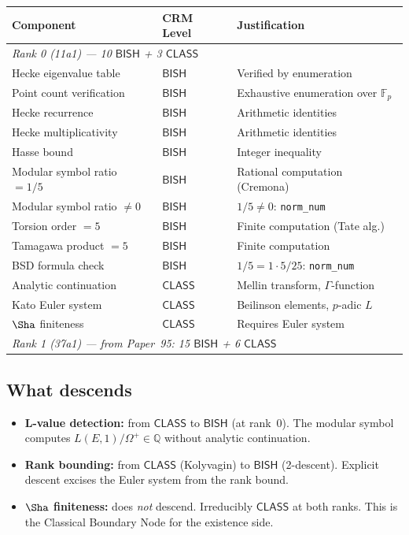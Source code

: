\documentclass[11pt]{article}
\theoremstyle{plain}
\theoremstyle{definition}
\theoremstyle{remark}
\newcommand{\Q}{\mathbb{Q}}
\newcommand{\F}{\mathbb{F}}
\newcommand{\BISH}{\ensuremath{\mathsf{BISH}}}
\newcommand{\CLASS}{\ensuremath{\mathsf{CLASS}}}
\begin{document}
\begin{center}
\begin{tabular}{lll}
\toprule
\textbf{Component} & \textbf{CRM Level} & \textbf{Justification} \\
\midrule
\multicolumn{3}{l}{\emph{Rank 0 (11a1) --- 10 $\BISH$ + 3 $\CLASS$}} \\
Hecke eigenvalue table & $\BISH$ & Verified by enumeration \\
Point count verification & $\BISH$ & Exhaustive enumeration over $\F_p$ \\
Hecke recurrence & $\BISH$ & Arithmetic identities \\
Hecke multiplicativity & $\BISH$ & Arithmetic identities \\
Hasse bound & $\BISH$ & Integer inequality \\
Modular symbol ratio $= 1/5$ & $\BISH$ & Rational computation (Cremona) \\
Modular symbol ratio $\neq 0$ & $\BISH$ & $1/5 \neq 0$: \texttt{norm\_num} \\
Torsion order $= 5$ & $\BISH$ & Finite computation (Tate alg.)\ \\
Tamagawa product $= 5$ & $\BISH$ & Finite computation \\
BSD formula check & $\BISH$ & $1/5 = 1 \cdot 5/25$: \texttt{norm\_num} \\
\midrule
Analytic continuation & $\CLASS$ & Mellin transform, $\Gamma$-function \\
Kato Euler system & $\CLASS$ & Beilinson elements, $p$-adic $L$ \\
$\Sha$ finiteness & $\CLASS$ & Requires Euler system \\
\midrule
\multicolumn{3}{l}{\emph{Rank 1 (37a1) --- from Paper~95: 15 $\BISH$ + 6 $\CLASS$}} \\
\bottomrule
\end{tabular}
\end{center}

\subsection{What descends}

\begin{itemize}[nosep]
\item \textbf{L-value detection:} from $\CLASS$ to $\BISH$ (at rank~0). The modular symbol computes $L(E,1)/\Omega^+ \in \Q$ without analytic continuation.
\item \textbf{Rank bounding:} from $\CLASS$ (Kolyvagin) to $\BISH$ (2-descent). Explicit descent excises the Euler system from the rank bound.
\item \textbf{$\Sha$ finiteness:} does \emph{not} descend. Irreducibly $\CLASS$ at both ranks. This is the Classical Boundary Node for the existence side.
\end{itemize}
\end{document}
